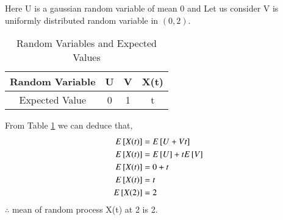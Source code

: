 Here U is a gaussian random variable of mean 0 and Let us consider V is uniformly distributed random variable in $(0,2)$.
\begin{table}[h]
\centering
\begin{tabular}{|c|c|c|c|}
\hline
   Random Variable             & U & V & X(t)  \\ \hline
Expected Value & 0 & 1 & t\\ \hline
\end{tabular}
\caption{Random Variables and Expected Values}
\label{tab:expected values}
\end{table}

From Table \ref{tab:expected values} we can deduce that,
\begin{align}
    E{}\left[X(t)\right]&=E{}\left[U+Vt\right]\\
    E{}\left[X(t)\right]&=E{}\left[U\right]+tE{}\left[V\right]\\
    E{}\left[X(t)\right]&=0+t\\
    E{}\left[X(t)\right]&=t\\
    E{}\left[X(2)\right]&=2
\end{align}
 $ \therefore$ mean of random process X(t) at 2 is 2.
